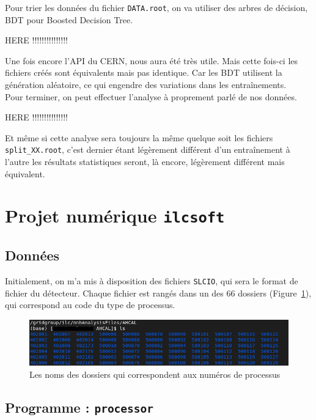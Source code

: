 \documentclass[10pt,a4paper]{report}
\newcommand{\qqs}{quelque soit\xspace}
\newcommand{\SLCIO}{\texttt{SLCIO}\xspace}
\newcommand{\ilcsoft}{\texttt{ilcsoft}\xspace}
\newcommand{\processor}{\texttt{processor}\xspace}
\begin{document}
Pour trier les données du fichier \texttt{DATA.root}, on va utiliser des arbres de décision, BDT pour Boosted Decision Tree. 


HERE !!!!!!!!!!!!!!!


Une fois encore l'API du CERN, nous aura été très utile. Mais cette fois-ci les fichiers créés sont équivalents mais pas identique. Car les BDT utilisent la génération aléatoire, ce qui engendre des variations dans les entraînements.\\

Pour terminer, on peut effectuer l'analyse à proprement parlé de nos données.


HERE !!!!!!!!!!!!!!!


Et même si cette analyse sera toujours la même \qqs les fichiers \texttt{split\_XX.root}, c'est dernier étant légèrement différent d'un entraînement à l'autre les résultats statistiques seront, là encore, légèrement différent mais équivalent.

\section{Projet numérique \ilcsoft}

\subsection{Données}
Initialement, on m'a mis à disposition des fichiers \SLCIO, qui sera le format de fichier du détecteur.
Chaque fichier est rangés dans un des 66 dossiers (Figure~\ref{listeProcessus}), qui correspond au code du type de processus.

\begin{figure}[h!]
	\includegraphics[width=\textwidth]{../img/listeProcessus.png} 
	\caption{Les noms des dossiers qui correspondent aux numéros de processus}
	\label{listeProcessus}
\end{figure}


\subsection{Programme : \processor}
\end{document}
